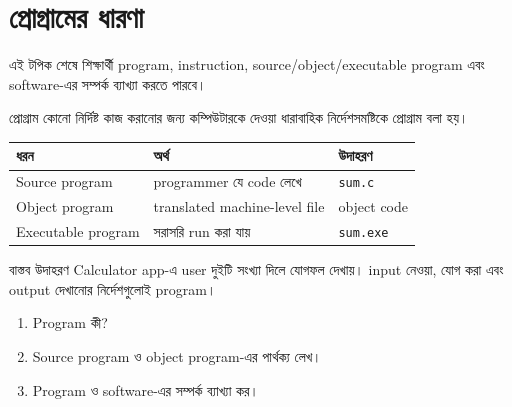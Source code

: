 \section{প্রোগ্রামের ধারণা}

\begin{learningbox}
এই টপিক শেষে শিক্ষার্থী program, instruction, source/object/executable program এবং software-এর সম্পর্ক ব্যাখ্যা করতে পারবে।
\end{learningbox}

\begin{definitionbox}{প্রোগ্রাম}
কোনো নির্দিষ্ট কাজ করানোর জন্য কম্পিউটারকে দেওয়া ধারাবাহিক নির্দেশসমষ্টিকে প্রোগ্রাম বলা হয়।
\end{definitionbox}

\begin{center}
\begin{tabular}{|p{}|p{}|p{}|}
\hline
\textbf{ধরন} & \textbf{অর্থ} & \textbf{উদাহরণ} \\
\hline
Source program & programmer যে code লেখে & \texttt{sum.c} \\
\hline
Object program & translated machine-level file & object code \\
\hline
Executable program & সরাসরি run করা যায় & \texttt{sum.exe} \\
\hline
\end{tabular}
\end{center}

\begin{examplebox}{বাস্তব উদাহরণ}
Calculator app-এ user দুইটি সংখ্যা দিলে যোগফল দেখায়। input নেওয়া, যোগ করা এবং output দেখানোর নির্দেশগুলোই program।
\end{examplebox}

\begin{practicebox}
\begin{enumerate}
\item Program কী?
\item Source program ও object program-এর পার্থক্য লেখ।
\item Program ও software-এর সম্পর্ক ব্যাখ্যা কর।
\end{enumerate}
\end{practicebox}
